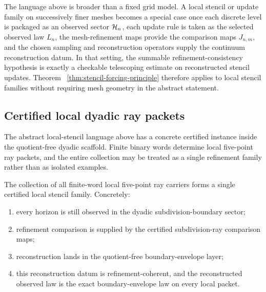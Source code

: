 \begin{remark}
\label{rem:local-stencil-families}
The language above is broader than a fixed grid model. A local stencil or
update family on successively finer meshes becomes a special case once each
discrete level is packaged as an observed sector $\mathcal{H}_n$, each update rule is
taken as the selected observed law $L_n$, the mesh-refinement maps provide the
comparison maps $J_{n,m}$, and the chosen sampling and reconstruction
operators supply the continuum reconstruction datum. In that setting, the
summable refinement-consistency hypothesis is exactly a checkable telescoping
estimate on reconstructed stencil updates. Theorem
~\ref{thm:stencil-forcing-principle} therefore applies to local stencil
families without requiring mesh geometry in the abstract statement.
\end{remark}

\subsection{Certified local dyadic ray packets}

The abstract local-stencil language above has a concrete certified instance
inside the quotient-free dyadic scaffold. Finite binary words determine local
five-point ray packets, and the entire collection may be treated as a single
refinement family rather than as isolated examples.

\begin{proposition}
\label{prop:word-local-ray-stencil}
The collection of all finite-word local five-point ray carriers forms a single
certified local stencil family. Concretely:
\begin{enumerate}[label=(\roman*), leftmargin=2em, itemsep=0.2em]
\item every horizon is still observed in the dyadic subdivision-boundary
      sector;
\item refinement comparison is supplied by the certified subdivision-ray
      comparison maps;
\item reconstruction lands in the quotient-free boundary-envelope layer;
\item this reconstruction datum is refinement-coherent, and the reconstructed
      observed law is the exact boundary-envelope law on every local packet.
\end{enumerate}
\end{proposition}

